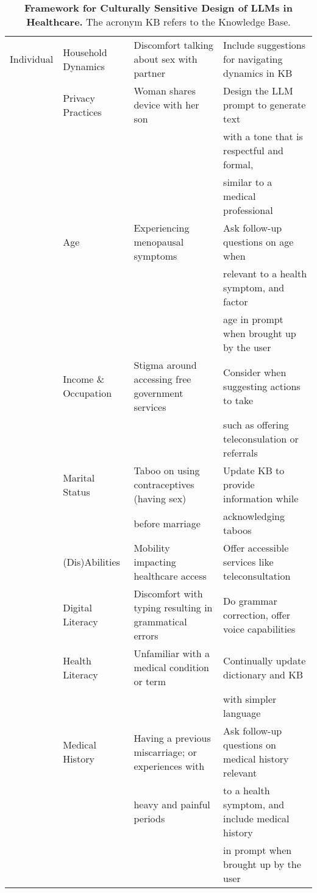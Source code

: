 \begin{table*}[h]
\begin{tabular}{l l l l}
Individual & Household Dynamics & Discomfort talking about sex with partner & Include suggestions for navigating dynamics in KB \\
 & Privacy Practices & Woman shares device with her son & Design the LLM prompt to generate text \\
 & &  & with a tone that is respectful and formal,\\
 & &  &  similar to a medical professional \\ 
 & Age & Experiencing menopausal symptoms & Ask follow-up questions on age when \\
   &  &  &  relevant to a health symptom, and factor \\
      &  &  &  age in prompt when brought up by the user \\
 & Income \& Occupation & Stigma around accessing free government services & Consider when suggesting actions to take \\
& & & such as offering teleconsulation or referrals \\
 & Marital Status & Taboo on using contraceptives (having sex) & Update KB to provide information while  \\
    &  &  before marriage & acknowledging taboos \\
 & (Dis)Abilities & Mobility impacting healthcare access & Offer accessible services like teleconsultation \\ 
 & Digital Literacy & Discomfort with typing resulting in grammatical errors & Do grammar correction, offer voice capabilities \\
 & Health Literacy & Unfamiliar with a medical condition or term & Continually update dictionary and KB\\
 & & & with simpler language\\
 & Medical History & Having a previous miscarriage; or experiences with & Ask follow-up questions on medical history relevant\\
  &  & heavy and painful periods &  to a health symptom, and include medical history \\
  &  &  & in prompt when brought up by the user \\
\bottomrule
  \end{tabular}
    \vspace{-10pt}
 \caption{\textbf{Framework for Culturally Sensitive Design of LLMs in Healthcare.} The acronym KB refers to the Knowledge Base.}
  \label{tab:framework}
  \end{table*}